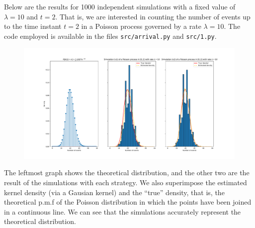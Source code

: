 Below are the results for 1000 independent simulations with a fixed value of $\lambda = 10$ and $t=2$. That is, we are interested in counting the number of events up to the time instant $t=2$ in a Poisson process governed by a rate $\lambda=10$. The code employed is available in the files \verb|src/arrival.py| and \verb|src/1.py|.

\begin{figure}[h!]
  \centering
  \includegraphics[width=\textwidth]{img/ex1.pdf}
\end{figure}

The leftmost graph shows the theoretical distribution, and the other two are the result of the simulations with each strategy. We also superimpose the estimated kernel density (via a Gausian kernel) and the ``true'' density, that is, the theoretical p.m.f of the Poisson distribution in which the points have been joined in a continuous line. We can see that the simulations accurately represent the theoretical distribution.
